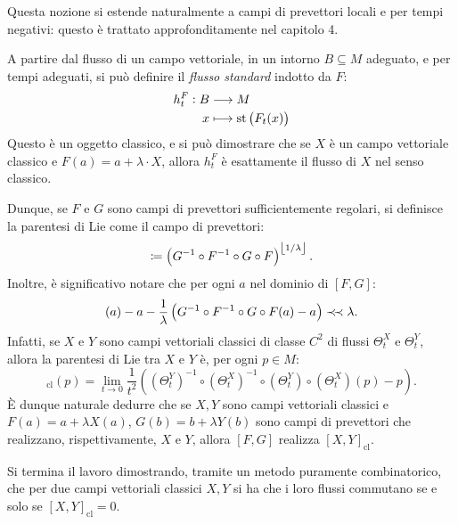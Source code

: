 Questa nozione si estende naturalmente a campi di prevettori locali e per tempi negativi: questo è trattato approfonditamente nel capitolo 4. 

A partire dal flusso di un campo vettoriale, in un intorno $ B \subseteq M$ adeguato, e per tempi adeguati, si può definire il \emph{flusso standard} indotto da $ F $: \begin{align*}
h^{F}_t:B &\longrightarrow M \\
x &\longmapsto \operatorname{st}\left(F_{t}(x) \right)
\end{align*}Questo è un oggetto classico, e si può dimostrare che se $ X $ è un campo vettoriale classico e $ F(a) =a + \lambda \cdot X $, allora $ h_{t}^{F}  $  è esattamente il flusso di $ X $ nel senso classico. 

Dunque, se $ F $ e $ G $ sono campi di prevettori sufficientemente regolari, si definisce la parentesi di Lie come il campo di prevettori: \begin{equation*}
    [F,G] \coloneqq \left(G^{-1}\circ F^{-1}\circ G\circ F\right)^{\floor{1/\lambda}}.
\end{equation*}Inoltre, è significativo notare che per ogni $ a $ nel dominio di $ [F,G] $: \begin{equation*}
    [F,G](a) - a - \frac{1}{\lambda}\left(G^{-1}\circ F^{-1}\circ G\circ F(a)-a\right)\pprec \lambda.
\end{equation*}Infatti, se $ X $ e $ Y $ sono campi vettoriali classici di classe $ C^{2} $ di flussi $ \Theta^{X}_t  $ e $ \Theta^{Y}_t $, allora la parentesi di Lie tra $ X $ e $ Y $ è, per ogni $ p \in M $: \begin{equation*}
    [X,Y]_{\text{cl}}(p) = \lim_{t\to 0} \frac{1}{t^{2}}\left(\left(\Theta^{Y}_t\right)^{-1}\circ\left(\Theta^{X}_t\right)^{-1}\circ \left(\Theta^{Y}_t\right)\circ \left(\Theta^{X}_t\right)(p)-p\right).
\end{equation*}È dunque naturale dedurre che se $ X,Y $ sono campi vettoriali classici e $ F(a)=a + \lambda X(a) $, $ G(b) = b+\lambda Y(b) $ sono campi di prevettori che realizzano, rispettivamente, $ X $ e $ Y $, allora $ [F,G] $ realizza $ [X,Y]_{\text{cl}} $.

Si termina il lavoro dimostrando, tramite un metodo puramente combinatorico, che per due campi vettoriali classici $ X, Y$ si ha che i loro flussi commutano se e solo se $ [X,Y]_{\text{cl}}=0 $.